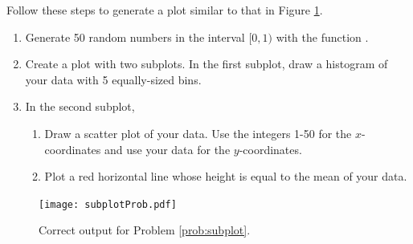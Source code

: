 \begin{problem}\label{prob:subplot}
Follow these steps to generate a plot similar to that in Figure \ref{fig:subplotProb}.
\begin{enumerate}
\item Generate 50 random numbers in the interval $[0,1)$ with the function .
\item Create a plot with two subplots. 
In the first subplot, draw a histogram of your data with 5 equally-sized bins.
\item In the second subplot, 
\begin{enumerate}
\item Draw a scatter plot of your data. 
Use the integers 1-50 for the $x$-coordinates and use your data for the $y$-coordinates.
\item Plot a red horizontal line whose height is equal to the mean of your data.
\end{enumerate}
\end{enumerate}

\begin{figure}[H]
\texttt{[image: subplotProb.pdf]}
\caption{Correct output for Problem \ref{prob:subplot}.}
\label{fig:subplotProb}
\end{figure}

\end{problem}

